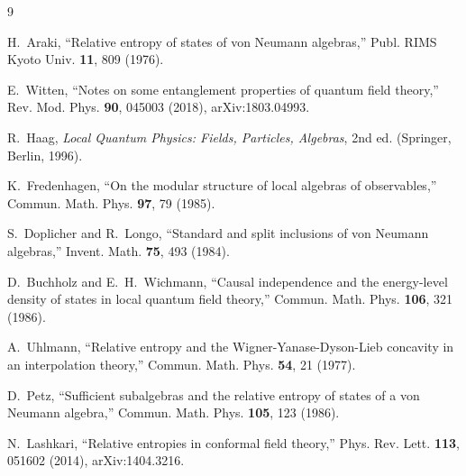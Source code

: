 \documentclass[aps,prd,reprint,nofootinbib,longbibliography]{revtex4-2}
\begin{document}
\begin{thebibliography}{9}

H.~Araki,
``Relative entropy of states of von Neumann algebras,''
Publ. RIMS Kyoto Univ. \textbf{11}, 809 (1976).

E.~Witten,
``Notes on some entanglement properties of quantum field theory,''
Rev. Mod. Phys. \textbf{90}, 045003 (2018),
arXiv:1803.04993.

R.~Haag,
\emph{Local Quantum Physics: Fields, Particles, Algebras},
2nd ed. (Springer, Berlin, 1996).

K.~Fredenhagen,
``On the modular structure of local algebras of observables,''
Commun. Math. Phys. \textbf{97}, 79 (1985).

S.~Doplicher and R.~Longo,
``Standard and split inclusions of von Neumann algebras,''
Invent. Math. \textbf{75}, 493 (1984).

D.~Buchholz and E.~H.~Wichmann,
``Causal independence and the energy-level density of states in local
quantum field theory,''
Commun. Math. Phys. \textbf{106}, 321 (1986).

A.~Uhlmann,
``Relative entropy and the Wigner-Yanase-Dyson-Lieb concavity in an
interpolation theory,''
Commun. Math. Phys. \textbf{54}, 21 (1977).

D.~Petz,
``Sufficient subalgebras and the relative entropy of states of a von
Neumann algebra,''
Commun. Math. Phys. \textbf{105}, 123 (1986).

N.~Lashkari,
``Relative entropies in conformal field theory,''
Phys. Rev. Lett. \textbf{113}, 051602 (2014),
arXiv:1404.3216.

\end{thebibliography}
\end{document}
